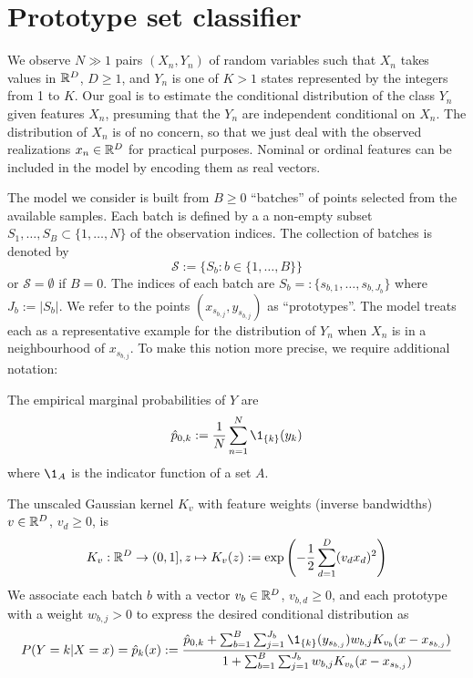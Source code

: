 \chapter{Prototype set classifier}
\label{ch_classifier}
%
We observe $N\gg1$ pairs $(X_n,Y_n)$ of random variables such that $X_n$ takes values in $\mathbb{R}^D$, $D\geq1$, and $Y_n$ is one of $K>1$ states represented by the integers from 1 to $K$.
Our goal is to estimate the conditional distribution of the class $Y_n$ given features $X_n$, presuming that the $Y_n$ are independent conditional on $X_n$.
The distribution of $X_n$ is of no concern, so that we just deal with the observed realizations $x_n\in\mathbb{R}^D$ for practical purposes.
Nominal or ordinal features can be included in the model by encoding them as real vectors.\par
%
The model we consider is built from $B\geq0$ ``batches'' of points selected from the available samples.
Each batch is defined by a a non-empty subset $S_1,\dots,S_B\subset\{1,\dots,N\}$ of the observation indices.
The collection of batches is denoted by
%
\begin{equation}
\mathcal{S}:=\{S_b:b\in\{1,\dots,B\}\}\label{eq_batches}
\end{equation}
%
or $\mathcal{S}=\emptyset$ if $B=0$.
The indices of each batch are $S_b=:\{s_{b,1},\dots,s_{b,J_b}\}$ where $J_b:=|S_b|$.
We refer to the points $(x_{s_{b,j}},y_{s_{b,j}})$ as ``prototypes''.
The model treats each as a representative example for the distribution of $Y_n$ when $X_n$ is in a neighbourhood of $x_{s_{b,j}}$.
To make this notion more precise, we require additional notation:\par
%
The empirical marginal probabilities of $Y$ are
%
\begin{equation}
\hat{p}_{0,k}:=\frac{1}{N}\sum_{n=1}^N\1_{\{k\}}(y_k)\label{eq_p0k}
\end{equation}
%
where $\1_A$ is the indicator function of a set $A$.\par
%
The unscaled Gaussian kernel $K_v$ with feature weights (inverse bandwidths) $v\in\mathbb{R}^D$, $v_d\geq0$, is
%
\begin{equation}
K_v:\mathbb{R}^D\rightarrow(0,1],
z\mapsto K_v(z):=\exp\left(-\frac{1}{2}\sum_{d=1}^D(v_dx_d)^2\right)\label{eq_kernel}
\end{equation}
%
We associate each batch $b$ with a vector $v_b\in\mathbb{R}^D$, $v_{b,d}\geq0$, and each prototype with a weight $w_{b,j}>0$ to express the desired conditional distribution as
%
\begin{equation}
P(Y=k|X=x)=\hat{p}_k(x):=
\frac{\hat{p}_{0,k}+\sum_{b=1}^B\sum_{j=1}^{J_b}\1_{\{k\}}(y_{s_{b,j}})w_{b,j}K_{v_b}(x-x_{s_{b,j}})}
{1+\sum_{b=1}^B\sum_{j=1}^{J_b}w_{b,j}K_{v_b}(x-x_{s_{b,j}})}
\label{eq_pkx}
\end{equation}
